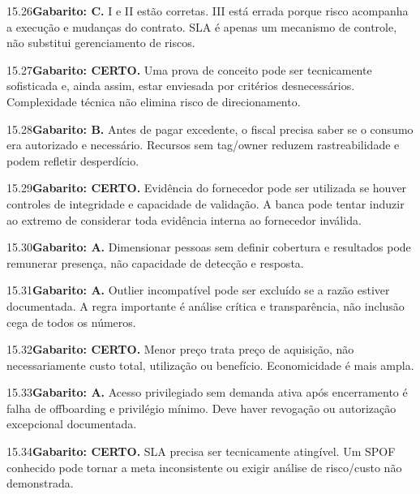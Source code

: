\begin{solucao}{15.26}\textbf{Gabarito: C.} I e II estão corretas. III está errada porque risco acompanha a execução e mudanças do contrato. SLA é apenas um mecanismo de controle, não substitui gerenciamento de riscos.\end{solucao}
\begin{solucao}{15.27}\textbf{Gabarito: CERTO.} Uma prova de conceito pode ser tecnicamente sofisticada e, ainda assim, estar enviesada por critérios desnecessários. Complexidade técnica não elimina risco de direcionamento.\end{solucao}
\begin{solucao}{15.28}\textbf{Gabarito: B.} Antes de pagar excedente, o fiscal precisa saber se o consumo era autorizado e necessário. Recursos sem tag/owner reduzem rastreabilidade e podem refletir desperdício.\end{solucao}
\begin{solucao}{15.29}\textbf{Gabarito: CERTO.} Evidência do fornecedor pode ser utilizada se houver controles de integridade e capacidade de validação. A banca pode tentar induzir ao extremo de considerar toda evidência interna ao fornecedor inválida.\end{solucao}
\begin{solucao}{15.30}\textbf{Gabarito: A.} Dimensionar pessoas sem definir cobertura e resultados pode remunerar presença, não capacidade de detecção e resposta.\end{solucao}
\begin{solucao}{15.31}\textbf{Gabarito: A.} Outlier incompatível pode ser excluído se a razão estiver documentada. A regra importante é análise crítica e transparência, não inclusão cega de todos os números.\end{solucao}
\begin{solucao}{15.32}\textbf{Gabarito: CERTO.} Menor preço trata preço de aquisição, não necessariamente custo total, utilização ou benefício. Economicidade é mais ampla.\end{solucao}
\begin{solucao}{15.33}\textbf{Gabarito: A.} Acesso privilegiado sem demanda ativa após encerramento é falha de offboarding e privilégio mínimo. Deve haver revogação ou autorização excepcional documentada.\end{solucao}
\begin{solucao}{15.34}\textbf{Gabarito: CERTO.} SLA precisa ser tecnicamente atingível. Um SPOF conhecido pode tornar a meta inconsistente ou exigir análise de risco/custo não demonstrada.\end{solucao}
